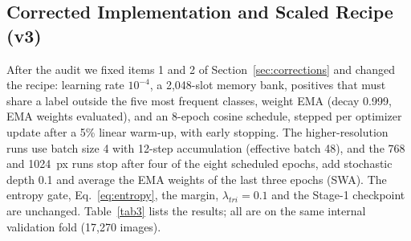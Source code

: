 \documentclass[conference]{IEEEtran}
\begin{document}
\subsection{Corrected Implementation and Scaled Recipe (v3)}
\label{sec:v3}
After the audit we fixed items 1 and 2 of Section~\ref{sec:corrections} and changed the recipe: learning rate $10^{-4}$, a 2,048-slot memory bank, positives that must share a label outside the five most frequent classes, weight EMA (decay 0.999, EMA weights evaluated), and an 8-epoch cosine schedule, stepped per optimizer update after a 5\% linear warm-up, with early stopping. The higher-resolution runs use batch size 4 with 12-step accumulation (effective batch 48), and the 768 and 1024~px runs stop after four of the eight scheduled epochs, add stochastic depth 0.1 and average the EMA weights of the last three epochs (SWA). The entropy gate, Eq.~\ref{eq:entropy}, the margin, $\lambda_{tri}{=}0.1$ and the Stage-1 checkpoint are unchanged. Table~\ref{tab3} lists the results; all are on the same internal validation fold (17,270 images).
\end{document}
